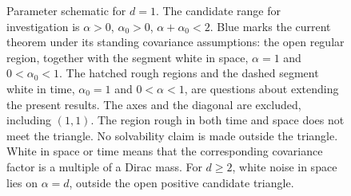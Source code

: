 \usetikzlibrary{patterns}
\begin{figure}[htbp]
  \centering
  
  \caption[Regular, white and rough noise in one dimension]{Parameter schematic for $d = 1$. The candidate range for
    investigation is $\alpha > 0$, $\alpha_0 > 0$, $\alpha + \alpha_0 < 2$. Blue
    marks the current theorem under its standing covariance assumptions: the
    open regular region, together with the segment white in space, $\alpha = 1$
    and $0 < \alpha_0 < 1$. The hatched rough regions and the dashed segment
    white in time, $\alpha_0 = 1$ and $0 < \alpha < 1$, are questions about
    extending the present results. The axes and the diagonal are excluded,
    including $(1,1)$. The region rough in both time and space does not meet the
    triangle. No solvability claim is made outside the triangle. White in space
    or time means that the corresponding covariance factor is a multiple of a
    Dirac mass. For $d \ge 2$, white noise in space lies on $\alpha = d$,
    outside the open positive candidate triangle.}
  \label{Fig:rough-noise-region}
\end{figure}
